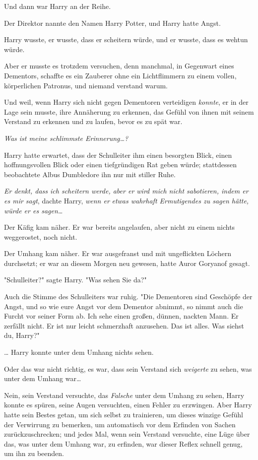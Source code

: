 {Und dann war Harry an der Reihe.

Der Direktor nannte den Namen Harry Potter, und Harry hatte Angst.

Harry wusste, er wusste, dass er scheitern würde, und er wusste, dass es wehtun würde.

Aber er musste es trotzdem versuchen, denn manchmal, in Gegenwart eines Dementors, schaffte es ein Zauberer ohne ein Lichtflimmern zu einem vollen, körperlichen Patronus, und niemand verstand warum.

Und weil, wenn Harry sich nicht gegen Dementoren verteidigen \emph{konnte}, er in der Lage sein musste, ihre Annäherung zu erkennen, das Gefühl von ihnen mit seinem Verstand zu erkennen und zu laufen, bevor es zu spät war.

\emph{\emph{Was ist meine schlimmste Erinnerung…?}}

Harry hatte erwartet, dass der Schulleiter ihm einen besorgten Blick, einen hoffnungsvollen Blick oder einen tiefgründigen Rat geben würde; stattdessen beobachtete Albus Dumbledore ihn nur mit stiller Ruhe.

\emph{Er denkt, dass ich scheitern werde, aber er wird mich nicht sabotieren, indem er es mir sagt}, dachte Harry, \emph{wenn er} \emph{etwas wahrhaft Ermutigendes zu sagen hätte, würde er es sagen…}

Der Käfig kam näher. Er war bereits angelaufen, aber nicht zu einem nichts weggerostet, noch nicht.

Der Umhang kam näher. Er war ausgefranst und mit ungeflickten Löchern durchsetzt; er war an diesem Morgen neu gewesen, hatte Auror Goryanof gesagt.

"Schulleiter?" sagte Harry. "Was sehen Sie da?"

Auch die Stimme des Schulleiters war ruhig. "Die Dementoren sind Geschöpfe der Angst, und so wie eure Angst vor dem Dementor abnimmt, so nimmt auch die Furcht vor seiner Form ab. Ich sehe einen großen, dünnen, nackten Mann. Er zerfällt nicht. Er ist nur leicht schmerzhaft anzusehen. Das ist alles. Was siehst du, Harry?"

… Harry konnte unter dem Umhang nichts sehen.

Oder das war nicht richtig, es war, dass sein Verstand sich \emph{weigerte} zu sehen, was unter dem Umhang war…

Nein, sein Verstand versuchte, das \emph{Falsche} unter dem Umhang zu sehen, Harry konnte es spüren, seine Augen versuchten, einen Fehler zu erzwingen. Aber Harry hatte sein Bestes getan, um sich selbst zu trainieren, um dieses winzige Gefühl der Verwirrung zu bemerken, um automatisch vor dem Erfinden von Sachen zurückzuschrecken; und jedes Mal, wenn sein Verstand versuchte, eine Lüge über das, was unter dem Umhang war, zu erfinden, war dieser Reflex schnell genug, um ihn zu beenden.

}
